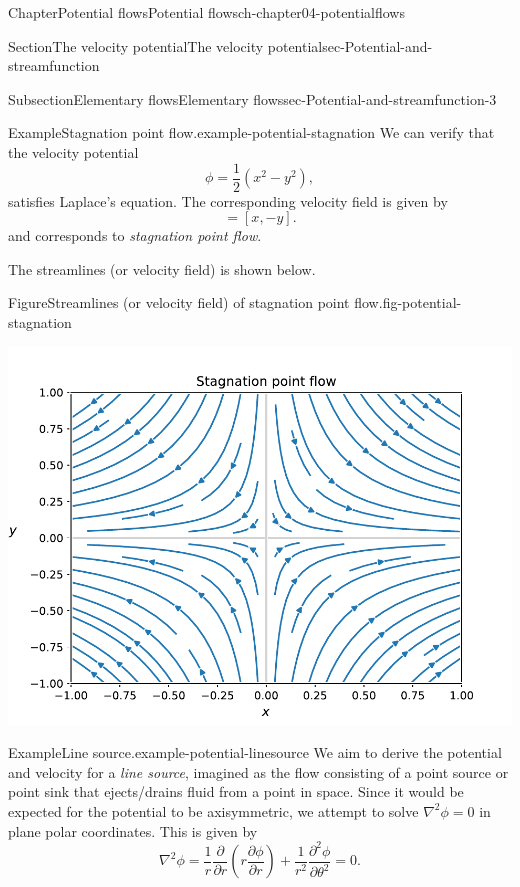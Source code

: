 \documentclass[oneside,10pt,]{book}
\numberwithin{equation}{section}
\newcommand{\pd}[2]{\frac{\partial#1}{\partial#2}}
\begin{document}
\begin{chapterptx}{Chapter}{Potential flows}{}{Potential flows}{}{}{ch-chapter04-potentialflows}
\begin{sectionptx}{Section}{The velocity potential}{}{The velocity potential}{}{}{sec-Potential-and-streamfunction}
\begin{subsectionptx}{Subsection}{Elementary flows}{}{Elementary flows}{}{}{sec-Potential-and-streamfunction-3}
\begin{example}{Example}{Stagnation point flow.}{example-potential-stagnation}
We can verify that the velocity potential%
\begin{equation*}
\phi = \frac{1}{2} (x^2 - y^2),
\end{equation*}
satisfies Laplace's equation. The corresponding velocity field is given by%
\begin{equation*}
[u, v] = [x, -y]. 
\end{equation*}
and corresponds to \emph{stagnation point flow}.%
\par
The streamlines (or velocity field) is shown below.%
\begin{figureptx}{Figure}{Streamlines (or velocity field) of stagnation point flow.}{fig-potential-stagnation}{}%
\begin{image}{0.05}{0.9}{0.05}{}%
\includegraphics[width=\linewidth]{external/stagnationflow.pdf}
\end{image}%
\tcblower
\end{figureptx}%
\end{example}
\begin{example}{Example}{Line source.}{example-potential-linesource}%
%
We aim to derive the potential and velocity for a \emph{line source}, imagined as the flow consisting of a point source or point sink that ejects\slash{}drains fluid from a point in space. Since it would be expected for the potential to be axisymmetric, we attempt to solve \(\nabla^2 \phi = 0\) in plane polar coordinates. This is given by%
\begin{equation*}
\nabla^2 \phi = \frac{1}{r} \pd{}{r}\left(r \pd{\phi}{r}\right) + \frac{1}{r^2} \pd{^2 \phi}{\theta^2} = 0.
\end{equation*}

\end{example}
\end{subsectionptx}
\end{sectionptx}
\end{chapterptx}
\end{document}
